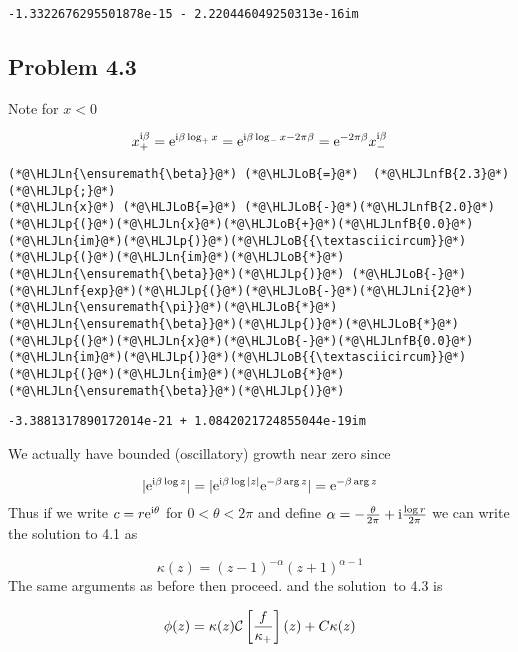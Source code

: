 \documentclass[12pt,a4paper]{article}
\newcommand{\HLJLn}[1]{#1}
\newcommand{\HLJLnf}[1]{\textcolor[RGB]{66,102,213}{#1}}
\newcommand{\HLJLnfB}[1]{\textcolor[RGB]{59,151,46}{#1}}
\newcommand{\HLJLni}[1]{\textcolor[RGB]{59,151,46}{#1}}
\newcommand{\HLJLoB}[1]{\textcolor[RGB]{102,102,102}{\textbf{#1}}}
\newcommand{\HLJLp}[1]{#1}
\def\I{ {\rm i} }
\def\E{ {\rm e} }
\def\CC{ {\cal C} }
\def\br[#1]{\left[{#1}\right]}
\begin{document}
\begin{lstlisting}
-1.3322676295501878e-15 - 2.220446049250313e-16im
\end{lstlisting}


\subsection{Problem 4.3}
Note for $x < 0$

\[
x_+^{\I \beta} = \E^{\I \beta \log_+ x} = \E^{\I \beta \log_- x - 2\pi \beta} = \E^{-2 \pi \beta} x_-^{\I \beta}
\]

\begin{lstlisting}
(*@\HLJLn{\ensuremath{\beta}}@*) (*@\HLJLoB{=}@*)  (*@\HLJLnfB{2.3}@*)(*@\HLJLp{;}@*)
(*@\HLJLn{x}@*) (*@\HLJLoB{=}@*) (*@\HLJLoB{-}@*)(*@\HLJLnfB{2.0}@*)
(*@\HLJLp{(}@*)(*@\HLJLn{x}@*)(*@\HLJLoB{+}@*)(*@\HLJLnfB{0.0}@*)(*@\HLJLn{im}@*)(*@\HLJLp{)}@*)(*@\HLJLoB{{\textasciicircum}}@*)(*@\HLJLp{(}@*)(*@\HLJLn{im}@*)(*@\HLJLoB{*}@*)(*@\HLJLn{\ensuremath{\beta}}@*)(*@\HLJLp{)}@*) (*@\HLJLoB{-}@*) (*@\HLJLnf{exp}@*)(*@\HLJLp{(}@*)(*@\HLJLoB{-}@*)(*@\HLJLni{2}@*)(*@\HLJLn{\ensuremath{\pi}}@*)(*@\HLJLoB{*}@*)(*@\HLJLn{\ensuremath{\beta}}@*)(*@\HLJLp{)}@*)(*@\HLJLoB{*}@*)(*@\HLJLp{(}@*)(*@\HLJLn{x}@*)(*@\HLJLoB{-}@*)(*@\HLJLnfB{0.0}@*)(*@\HLJLn{im}@*)(*@\HLJLp{)}@*)(*@\HLJLoB{{\textasciicircum}}@*)(*@\HLJLp{(}@*)(*@\HLJLn{im}@*)(*@\HLJLoB{*}@*)(*@\HLJLn{\ensuremath{\beta}}@*)(*@\HLJLp{)}@*)
\end{lstlisting}

\begin{lstlisting}
-3.3881317890172014e-21 + 1.0842021724855044e-19im
\end{lstlisting}


We actually have bounded (oscillatory) growth near zero since

\[
|\E^{\I \beta \log z}| = |\E^{\I \beta \log |z|} \E^{-\beta \arg z}| = \E^{-\beta \arg z}
\]
Thus if we write $c = r \E^{\I \theta}$ for $0 < \theta < 2 \pi$ and define $\alpha = -{\theta \over 2 \pi} + \I{\log r \over 2 \pi}$ we can write the solution to 4.1 as

\[
\kappa(z) = (z-1)^{-\alpha} (z+1)^{\alpha-1}
\]
The same arguments as before then proceed. and the solution to 4.3 is

\[
\phi(z) = \kappa(z) \CC\br[{f \over \kappa_+}](z)+ C \kappa(z)
\]
\end{document}
